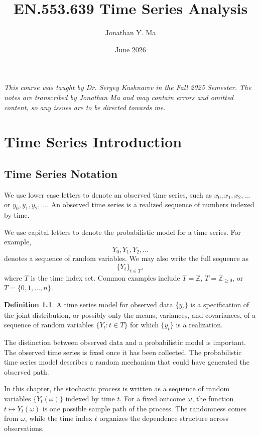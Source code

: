 \documentclass[12pt,oneside]{book}
\title{EN.553.639 Time Series Analysis}
\author{Jonathan Y. Ma}
\date{June 2026}
\numberwithin{equation}{section}
\theoremstyle{definition}
\newtheorem{definition}{Definition}[section]
\theoremstyle{plain}
\theoremstyle{remark}
\newcommand{\Z}{\mathbb{Z}}
\begin{document}
\maketitle

\noindent \emph{This course was taught by Dr. Sergey Kushnarev in the Fall 2025 Semester. The notes are transcribed by Jonathan Ma and may contain errors and omitted content, so any issues are to be directed towards me.}

\tableofcontents

\chapter{Time Series Introduction}

\section{Time Series Notation}

We use lower case letters to denote an observed time series, such as
$x_0,x_1,x_2,\ldots$ or $y_0,y_1,y_2,\ldots$. An observed time series is a realized sequence of numbers indexed by time.

We use capital letters to denote the probabilistic model for a time series. For example,
\[
Y_0,Y_1,Y_2,\ldots
\]
denotes a sequence of random variables. We may also write the full sequence as
\[
\{Y_t\}_{t \in T},
\]
where $T$ is the time index set. Common examples include $T=\Z$, $T=\Z_{\geq 0}$, or $T=\{0,1,\ldots,n\}$.

\begin{definition}
A time series model for observed data $\{y_t\}$ is a specification of the joint distribution, or possibly only the means, variances, and covariances, of a sequence of random variables $\{Y_t:t\in T\}$ for which $\{y_t\}$ is a realization.
\end{definition}

The distinction between observed data and a probabilistic model is important. The observed time series is fixed once it has been collected. The probabilistic time series model describes a random mechanism that could have generated the observed path.

In this chapter, the stochastic process is written as a sequence of random variables $\{Y_t(\omega)\}$ indexed by time $t$. For a fixed outcome $\omega$, the function $t \mapsto Y_t(\omega)$ is one possible sample path of the process. The randomness comes from $\omega$, while the time index $t$ organizes the dependence structure across observations.
\end{document}
